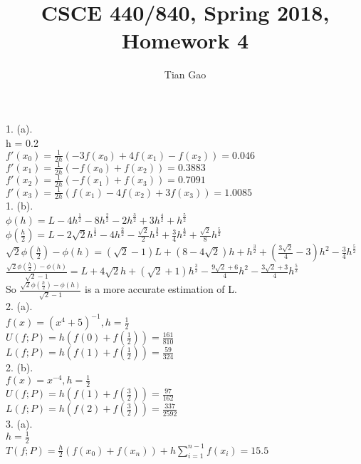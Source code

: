 \documentclass[a4paper]{article}
\title{CSCE 440/840, Spring 2018, Homework 4}
\author{Tian Gao}
\begin{document}
\maketitle


1. (a).\\
h = 0.2\\
$f'(x_0)=\frac{1}{2h}(-3f(x_0) + 4f(x_1) - f(x_2))=0.046$\\
$f'(x_1)=\frac{1}{2h}(-f(x_0) + f(x_2))=0.3883$\\
$f'(x_2)=\frac{1}{2h}(-f(x_1) + f(x_3))=0.7091$\\
$f'(x_3)=\frac{1}{2h}(f(x_1) - 4f(x_2) + 3f(x_3))=1.0085$\\

1. (b).\\
$\phi(h) = L - 4h^{\frac{1}{2}} - 8h^{\frac{2}{2}} - 2h^{\frac{3}{2}} + 3h^{\frac{4}{2}} + h^{\frac{5}{2}}$\\
$\phi(\frac{h}{2}) = L - 2 \sqrt2h^{\frac{1}{2}} - 4h^{\frac{2}{2}} - \frac{\sqrt2}{2}h^{\frac{3}{2}} + \frac{3}{4}h^{\frac{4}{2}} + \frac{\sqrt2}{8}h^{\frac{5}{2}}$\\
$\sqrt2\phi(\frac{h}{2}) - \phi(h) = (\sqrt2 - 1)L + (8 - 4\sqrt2)h+h^{\frac{3}{2}} + (\frac{3\sqrt2}{4} - 3)h^2-\frac{3}{4}h^{\frac{5}{2}}$\\
$\frac{\sqrt2\phi(\frac{h}{2}) - \phi(h)}{\sqrt2-1} = L + 4\sqrt2h+(\sqrt2+1)h^{\frac{3}{2}} - \frac{9\sqrt2 + 6}{4}h^2-\frac{3\sqrt2+3}{4}h^{\frac{5}{2}}$\\
So $\frac{\sqrt2\phi(\frac{h}{2}) - \phi(h)}{\sqrt2-1}$ is a more accurate estimation of L.\\

2. (a).\\
$f(x)=(x^4+5)^{-1}, h = \frac{1}{2}$\\
$U(f; P) = h(f(0) + f(\frac{1}{2})) = \frac{161}{810}$\\
$L(f; P) = h(f(1) + f(\frac{1}{2})) = \frac{59}{324}$\\

2. (b).\\
$f(x)=x^{-4}, h = \frac{1}{2}$\\
$U(f; P) = h(f(1) + f(\frac{3}{2})) = \frac{97}{162}$\\
$L(f; P) = h(f(2) + f(\frac{3}{2})) = \frac{337}{2592}$\\

3. (a).\\
$h=\frac{1}{2}$\\
$T(f;P)=\frac{h}{2}(f(x_0) + f(x_n)) + h\sum\limits_{i=1}^{n-1}f(x_i)= 15.5$\\
\end{document}
